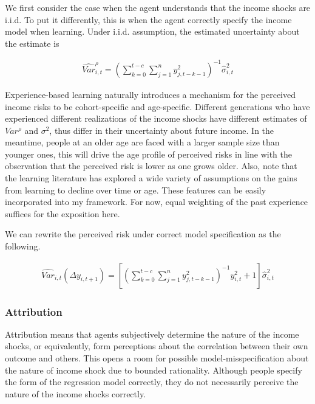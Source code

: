 \documentclass[12pt,notitlepage,onecolumn,aps,pra]{article}
\begin{document}
We first consider the case when the agent understands that the income
shocks are i.i.d. To put it differently, this is when the agent
correctly specify the income model when learning. Under i.i.d.
assumption, the estimated uncertainty about the estimate is

\begin{eqnarray}
\widehat {Var}^{\rho}_{i,t} = (\sum^{t-c}_{k=0}\sum^{n}_{j=1}y^2_{j,t-k-1})^{-1}\widehat{\sigma}^2_{i,t}
\end{eqnarray}

Experience-based learning naturally introduces a mechanism for the
perceived income risks to be cohort-specific and age-specific. Different
generations who have experienced different realizations of the income
shocks have different estimates of \(Var^{\rho}\) and \(\sigma^2\), thus
differ in their uncertainty about future income. In the meantime, people
at an older age are faced with a larger sample size than younger ones,
this will drive the age profile of perceived risks in line with the
observation that the perceived risk is lower as one grows older. Also,
note that the learning literature has explored a wide variety of
assumptions on the gains from learning to decline over time or age.
These features can be easily incorporated into my framework. For now,
equal weighting of the past experience suffices for the exposition here.

We can rewrite the perceived risk under correct model specification as
the following.

\begin{eqnarray}
\widehat{Var}_{i,t}(\Delta y_{i,t+1}) = [(\sum^{t-c}_{k=0}\sum^{n}_{j=1}y^2_{j,t-k-1})^{-1}y^2_{i,t} + 1] \hat{\sigma}^2_{i,t}
\end{eqnarray}

    \hypertarget{attribution}{%
\subsubsection{Attribution}\label{attribution}}

Attribution means that agents subjectively determine the nature of the
income shocks, or equivalently, form perceptions about the correlation
between their own outcome and others. This opens a room for possible
model-misspecification about the nature of income shock due to bounded
rationality. Although people specify the form of the regression model
correctly, they do not necessarily perceive the nature of the income
shocks correctly.
\end{document}
